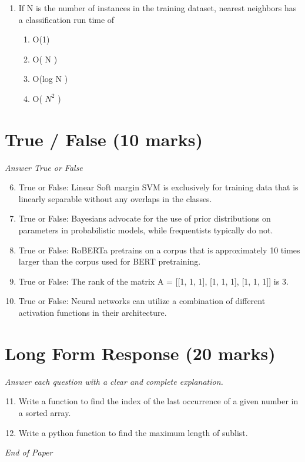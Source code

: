 \documentclass[12pt]{article}
\begin{document}
\begin{enumerate}[label=\arabic*.]
\begin{enumerate}[label=(\alph*)]
    \item Decrease the model complexity.
    \item Reduce the noise in the training data.
\end{enumerate}
\item If N is the number of instances in the training dataset, nearest neighbors has a classification run time of
\begin{enumerate}[label=(\alph*)]
    \item O(1)
    \item O( N )
    \item O(log N )
    \item O( $N^2$ )
\end{enumerate}
\end{enumerate}

\section*{True / False (10 marks)}
\textit{Answer True or False}
\begin{enumerate}[label=\arabic*.]
\setcounter{enumi}{5}
\item True or False: Linear Soft margin SVM is exclusively for training data that is linearly separable without any overlaps in the classes.
\item True or False: Bayesians advocate for the use of prior distributions on parameters in probabilistic models, while frequentists typically do not.
\item True or False: RoBERTa pretrains on a corpus that is approximately 10 times larger than the corpus used for BERT pretraining.
\item True or False: The rank of the matrix A = [[1, 1, 1], [1, 1, 1], [1, 1, 1]] is 3.
\item True or False: Neural networks can utilize a combination of different activation functions in their architecture.
\end{enumerate}

\section*{Long Form Response (20 marks)}
\textit{Answer each question with a clear and complete explanation.}
\begin{enumerate}[label=\arabic*.]
\setcounter{enumi}{10}
\item Write a function to find the index of the last occurrence of a given number in a sorted array.
\item Write a python function to find the maximum length of sublist.
\end{enumerate}

\vfill
\noindent\textit{End of Paper}
\end{document}
